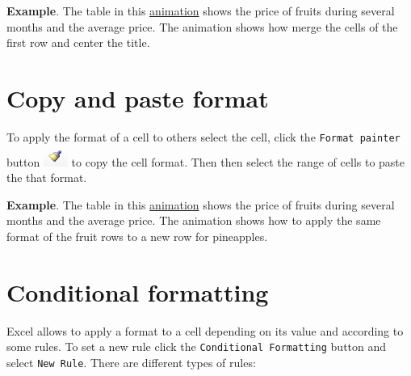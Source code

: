 \textbf{Example}. The table in this \href{http://aprendeconalf.es/office/excel/manual/img/example_merge_cells.gif}{animation} shows the price of fruits during several months and the average price. The animation shows how merge the cells of the first row and center the title.

\section{Copy and paste format}\hypertarget{copy-and-paste-format}{}\label{copy-and-paste-format}

To apply the format of a cell to others select the cell, click the \texttt{Format painter} button 
\includegraphics[scale=0.7]{../img/button_format_painter.png} to copy the cell format. Then then select the range of
cells to paste the that format.

\textbf{Example}. The table in this \href{http://aprendeconalf.es/office/excel/manual/img/example_format_painter.gif}{animation} shows the price of fruits during several months and the average price. The animation shows how to apply the same format of the fruit rows to a new row for pineapples.

\section{Conditional formatting}\hypertarget{conditional-formatting}{}\label{conditional-formatting}

Excel allows to apply a format to a cell depending on its value and according to some rules. To set a new rule click the
\texttt{Conditional Formatting} button and select \texttt{New Rule}. There are different types of rules:

